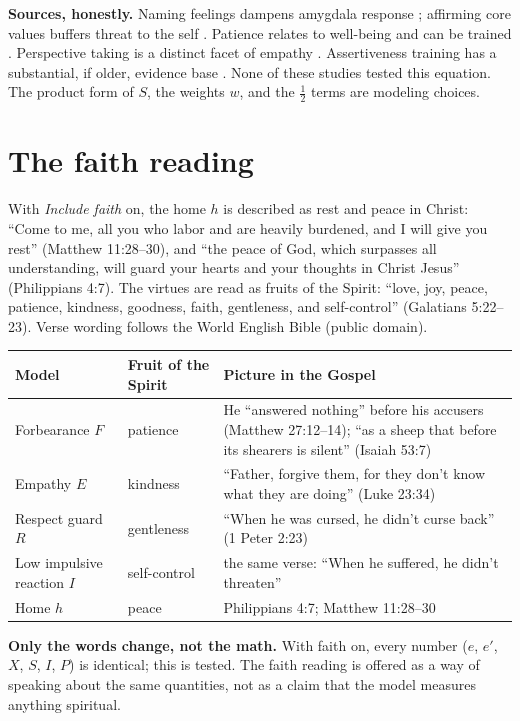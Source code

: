 \documentclass[10pt]{article}
\theoremstyle{remark}
\begin{document}
\textbf{Sources, honestly.} Naming feelings dampens amygdala response \citep{lieberman2007}; affirming core values buffers threat to the self \citep{cohen2014}. Patience relates to well-being and can be trained \citep{schnitker2012}. Perspective taking is a distinct facet of empathy \citep{davis1983}. Assertiveness training has a substantial, if older, evidence base \citep{speed2018}. None of these studies tested this equation. The product form of $S$, the weights $w$, and the $\tfrac12$ terms are modeling choices.

\section{The faith reading}
With \emph{Include faith} on, the home $h$ is described as rest and peace in Christ: ``Come to me, all you who labor and are heavily burdened, and I will give you rest'' (Matthew 11:28--30), and ``the peace of God, which surpasses all understanding, will guard your hearts and your thoughts in Christ Jesus'' (Philippians 4:7). The virtues are read as fruits of the Spirit: ``love, joy, peace, patience, kindness, goodness, faith, gentleness, and self-control'' (Galatians 5:22--23). Verse wording follows the World English Bible (public domain).

\begin{center}
\begin{tabularx}{\textwidth}{@{}lLL@{}}
\toprule
Model & Fruit of the Spirit & Picture in the Gospel\\
\midrule
Forbearance $F$ & patience & He ``answered nothing'' before his accusers (Matthew 27:12--14); ``as a sheep that before its shearers is silent'' (Isaiah 53:7)\\
Empathy $E$ & kindness & ``Father, forgive them, for they don't know what they are doing'' (Luke 23:34)\\
Respect guard $R$ & gentleness & ``When he was cursed, he didn't curse back'' (1 Peter 2:23)\\
Low impulsive reaction $I$ & self-control & the same verse: ``When he suffered, he didn't threaten''\\
Home $h$ & peace & Philippians 4:7; Matthew 11:28--30\\
\bottomrule
\end{tabularx}
\end{center}
\textbf{Only the words change, not the math.} With faith on, every number ($e$, $e'$, $X$, $S$, $I$, $P$) is identical; this is tested. The faith reading is offered as a way of speaking about the same quantities, not as a claim that the model measures anything spiritual.
\end{document}

